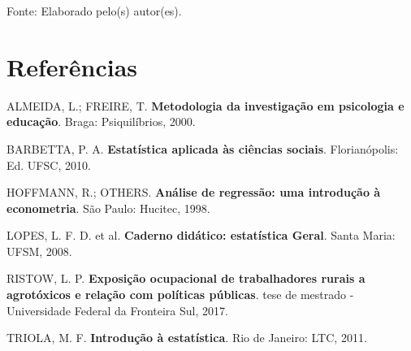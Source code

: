 \documentclass[12pt,brazil,]{book}
\begin{document}
Fonte: Elaborado pelo(s) autor(es).

\hypertarget{referencias}{%
\chapter*{Referências}\label{referencias}}

\hypertarget{refs}{}
\leavevmode\hypertarget{ref-R-rmarkdown}{}%

\leavevmode\hypertarget{ref-almeida2000}{}%
ALMEIDA, L.; FREIRE, T. \textbf{Metodologia da investigação em
psicologia e educação}. Braga: Psiquilíbrios, 2000.

\leavevmode\hypertarget{ref-barbetta1988}{}%
BARBETTA, P. A. \textbf{Estatística aplicada às ciências sociais}.
Florianópolis: Ed. UFSC, 2010.

\leavevmode\hypertarget{ref-hoffmann1998}{}%
HOFFMANN, R.; OTHERS. \textbf{Análise de regressão: uma introdução à
econometria}. São Paulo: Hucitec, 1998.

\leavevmode\hypertarget{ref-biblatex}{}%

\leavevmode\hypertarget{ref-lopes2008}{}%
LOPES, L. F. D. et al. \textbf{Caderno didático: estatística Geral}.
Santa Maria: UFSM, 2008.

\leavevmode\hypertarget{ref-Ristow2017}{}%
RISTOW, L. P. \textbf{Exposição ocupacional de trabalhadores rurais a
agrotóxicos e relação com políticas públicas}. tese de mestrado -
Universidade Federal da Fronteira Sul, 2017.

\leavevmode\hypertarget{ref-triola1999}{}%
TRIOLA, M. F. \textbf{Introdução à estatística}. Rio de Janeiro: LTC,
2011.
\end{document}
